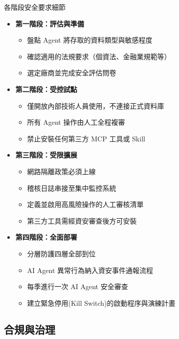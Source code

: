 \documentclass[aspectratio=1610]{Common/MyCourseBeamer}
\begin{document}
\begin{frame}[allowframebreaks=0.85]{各階段安全要求細節}

	\begin{itemize}
		\item \textbf{第一階段：評估與準備}
			\begin{itemize}
				\item 盤點 Agent 將存取的資料類型與敏感程度
				\item 確認適用的法規要求（個資法、金融業規範等）
				\item 選定廠商並完成安全評估問卷
			\end{itemize}

		\item \textbf{第二階段：受控試點}
			\begin{itemize}
				\item 僅開放內部技術人員使用，不連接正式資料庫
				\item 所有 Agent 操作由人工全程複審
				\item 禁止安裝任何第三方 MCP 工具或 Skill
			\end{itemize}

		\framebreak
		\item \textbf{第三階段：受限擴展}
			\begin{itemize}
				\item 網路隔離政策必須上線
				\item 稽核日誌串接至集中監控系統
				\item 定義並啟用高風險操作的人工審核清單
				\item 第三方工具需經資安審查後方可安裝
			\end{itemize}

		\item \textbf{第四階段：全面部署}
			\begin{itemize}
				\item 分層防護四層全部到位
				\item AI Agent 異常行為納入資安事件通報流程
				\item 每季進行一次 AI Agent 安全審查
				\item 建立緊急停用(Kill Switch)的啟動程序與演練計畫
			\end{itemize}
	\end{itemize}

\end{frame}


\subsection{合規與治理}
\end{document}
